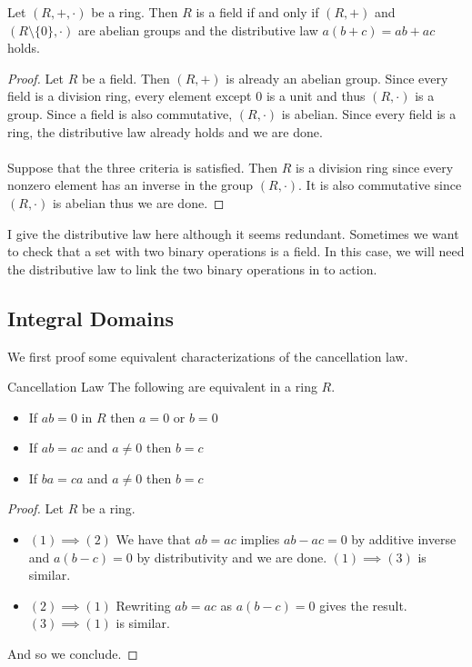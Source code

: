\documentclass[a4paper]{article}
\begin{document}
\begin{prp}{}{} Let $(R,+,\cdot)$ be a ring. Then $R$ is a field if and only if $(R,+)$ and $(R\setminus\{0\},\cdot)$ are abelian groups and the distributive law $a(b+c)=ab+ac$ holds. \tcbline
\begin{proof}
Let $R$ be a field. Then $(R,+)$ is already an abelian group. Since every field is a division ring, every element except $0$ is a unit and thus $(R,\cdot)$ is a group. Since a field is also commutative, $(R,\cdot)$ is abelian. Since every field is a ring, the distributive law already holds and we are done. \\~\\
Suppose that the three criteria is satisfied. Then $R$ is a division ring since every nonzero element has an inverse in the group $(R,\cdot)$. It is also commutative since $(R,\cdot)$ is abelian thus we are done. 
\end{proof}
\end{prp}

I give the distributive law here although it seems redundant. Sometimes we want to check that a set with two binary operations is a field. In this case, we will need the distributive law to link the two binary operations in to action. 

\subsection{Integral Domains}
We first proof some equivalent characterizations of the cancellation law. 
\begin{prp}{Cancellation Law}{} The following are equivalent in a ring $R$. 
\begin{itemize}
\item If $ab=0$ in $R$ then $a=0$ or $b=0$
\item If $ab=ac$ and $a\neq 0$ then $b=c$
\item If $ba=ca$ and $a\neq 0$ then $b=c$
\end{itemize}\tcbline
\begin{proof}
Let $R$ be a ring. 
\begin{itemize}
\item $(1)\implies(2)$ We have that $ab=ac$ implies $ab-ac=0$ by additive inverse and $a(b-c)=0$ by distributivity and we are done. $(1)\implies(3)$ is similar. 
\item $(2)\implies(1)$ Rewriting $ab=ac$ as $a(b-c)=0$ gives the result. $(3)\implies(1)$ is similar. 
\end{itemize}
And so we conclude. 
\end{proof}
\end{prp}
\end{document}
